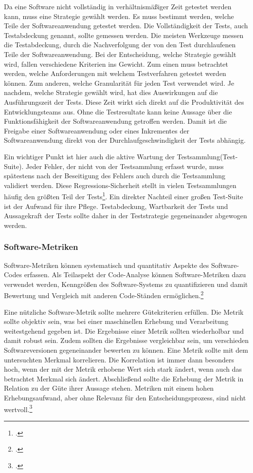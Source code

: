Da eine Software nicht vollständig in verhältnismäßiger Zeit getestet werden kann, muss eine Strategie gewählt werden. Es muss bestimmt werden, welche Teile der Softwareanwendung getestet werden. Die Vollständigkeit der Tests, auch Testabdeckung genannt, sollte gemessen werden. Die meisten Werkzeuge messen die Testabdeckung, durch die Nachverfolgung der von den Test durchlaufenen Teile der Softwareanwendung. Bei der Entscheidung, welche Strategie gewählt wird, fallen verschiedene Kriterien ins Gewicht. Zum einen muss betrachtet werden, welche Anforderungen mit welchem Testverfahren getestet werden können. Zum anderen, welche Granularität für jeden Test verwendet wird.
Je nachdem, welche Strategie gewählt wird, hat dies Auswirkungen auf die Ausführungszeit der Tests. Diese Zeit wirkt sich direkt auf die Produktivität des Entwicklungsteams aus. Ohne die Testresultate kann keine Aussage über die Funktionsfähigkeit der Softwareanwendung getroffen werden. Damit ist die Freigabe einer Softwareanwendung oder eines Inkrementes der Softwareanwendung direkt von der Durchlaufgeschwindigkeit der Tests abhängig. 

Ein wichtiger Punkt ist hier auch die aktive Wartung der Testsammlung(Test-Suite). Jeder Fehler, der nicht von der Testsammlung erfasst wurde, muss spätestens nach der Beseitigung des Fehlers auch durch die Testsammlung validiert werden. Diese Regressions-Sicherheit stellt in vielen Testsammlungen häufig den größten Teil der Tests\footcite[vgl.][]{software-quality2008}. Ein direkter Nachteil einer großen Test-Suite ist der Aufwand für ihre Pflege. Testabdeckung, Wartbarkeit der Tests und Aussagekraft der Tests sollte daher in der Teststrategie gegeneinander abgewogen werden.

\subsubsection{Software-Metriken}
\label{subsubsec:base-metrics}
Software-Metriken können systematisch und quantitativ Aspekte des Software-Codes erfassen. Als Teilaspekt der Code-Analyse können Software-Metriken dazu verwendet werden, Kenngrößen des Software-Systems zu quantifizieren und damit Bewertung und Vergleich mit anderen Code-Ständen ermöglichen.\footcite[S.247][]{software-quality2008}

Eine nützliche Software-Metrik sollte mehrere Gütekriterien erfüllen. Die Metrik sollte objektiv sein, was bei einer maschinellen Erhebung und Verarbeitung weitestgehend gegeben ist. Die Ergebnisse einer Metrik sollten wiederholbar und damit robust sein. Zudem sollten die Ergebnisse vergleichbar sein, um verschieden Softwareversionen gegeneinander bewerten zu können. Eine Metrik sollte mit dem untersuchten Merkmal korrelieren. Die Korrelation ist immer dann besonders hoch, wenn der mit der Metrik erhobene Wert sich stark ändert, wenn auch das betrachtet Merkmal sich ändert. Abschließend sollte die Erhebung der Metrik in Relation zu der Güte ihrer Aussage stehen. Metriken mit einem hohen Erhebungsaufwand, aber ohne Relevanz für den Entscheidungsprozess, sind nicht wertvoll.\footcite[S.248 ff][]{software-quality2008}

